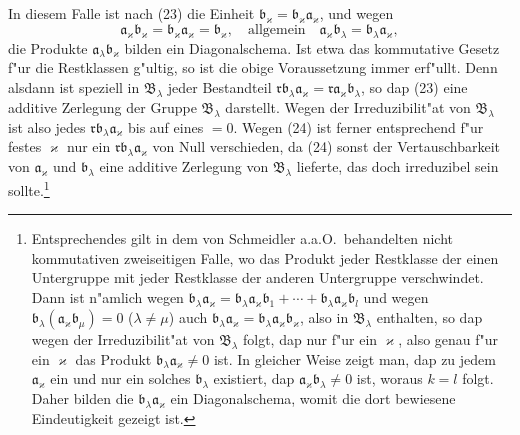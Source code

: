 \documentclass[12pt,a4paper]{article}
\begin{document}
In diesem Falle ist nach (23) die Einheit $\mathfrak{b}_\varkappa = \mathfrak{b}_\varkappa\mathfrak{a}_\varkappa$, und wegen
\begin{equation}
\mathfrak{a}_\varkappa\mathfrak{b}_\varkappa = \mathfrak{b}_\varkappa\mathfrak{a}_\varkappa = \mathfrak{b}_\varkappa, \quad \text{allgemein} \quad \mathfrak{a}_\varkappa\mathfrak{b}_\lambda = \mathfrak{b}_\lambda\mathfrak{a}_\varkappa, \tag{24}
\end{equation}
die Produkte $\mathfrak{a}_\lambda\mathfrak{b}_\varkappa$ bilden ein Diagonalschema. Ist etwa das kommutative Gesetz f"ur die Restklassen g"ultig, so ist die obige Voraussetzung immer erf"ullt. Denn alsdann ist speziell in $\mathfrak{B}_\lambda$ jeder Bestandteil $\mathfrak{r}\mathfrak{b}_\lambda\mathfrak{a}_\varkappa = \mathfrak{r}\mathfrak{a}_\varkappa\mathfrak{b}_\lambda$, so dap (23) eine additive Zerlegung der Gruppe $\mathfrak{B}_\lambda$ darstellt. Wegen der Irreduzibilit"at von $\mathfrak{B}_\lambda$ ist also jedes $\mathfrak{r}\mathfrak{b}_\lambda\mathfrak{a}_\varkappa$ bis auf eines $= 0$. Wegen (24) ist ferner entsprechend f"ur festes $\varkappa$ nur ein $\mathfrak{r}\mathfrak{b}_\lambda\mathfrak{a}_\varkappa$ von Null verschieden, da (24) sonst der Vertauschbarkeit von $\mathfrak{a}_\varkappa$ und $\mathfrak{b}_\lambda$ eine additive Zerlegung von $\mathfrak{B}_\lambda$ lieferte, das doch irreduzibel sein sollte.\footnote{Entsprechendes gilt in dem von Schmeidler a.a.O.\ behandelten nicht kommutativen zweiseitigen Falle, wo das Produkt jeder Restklasse der einen Untergruppe mit jeder Restklasse der anderen Untergruppe verschwindet. Dann ist n"amlich wegen $\mathfrak{b}_\lambda\mathfrak{a}_\varkappa = \mathfrak{b}_\lambda\mathfrak{a}_\varkappa\mathfrak{b}_1 + \cdots + \mathfrak{b}_\lambda\mathfrak{a}_\varkappa\mathfrak{b}_l$ und wegen $\mathfrak{b}_\lambda(\mathfrak{a}_\varkappa\mathfrak{b}_\mu) = 0$ ($\lambda \neq \mu$) auch $\mathfrak{b}_\lambda\mathfrak{a}_\varkappa = \mathfrak{b}_\lambda\mathfrak{a}_\varkappa\mathfrak{b}_\varkappa$, also in $\mathfrak{B}_\lambda$ enthalten, so dap wegen der Irreduzibilit"at von $\mathfrak{B}_\lambda$ folgt, dap nur f"ur ein $\varkappa$, also genau f"ur ein $\varkappa$ das Produkt $\mathfrak{b}_\lambda\mathfrak{a}_\varkappa \neq 0$ ist. In gleicher Weise zeigt man, dap zu jedem $\mathfrak{a}_\varkappa$ ein und nur ein solches $\mathfrak{b}_\lambda$ existiert, dap $\mathfrak{a}_\varkappa\mathfrak{b}_\lambda \neq 0$ ist, woraus $k=l$ folgt. Daher bilden die $\mathfrak{b}_\lambda\mathfrak{a}_\varkappa$ ein Diagonalschema, womit die dort bewiesene Eindeutigkeit gezeigt ist.}
\end{document}
